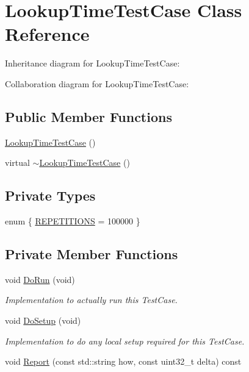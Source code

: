 \hypertarget{classLookupTimeTestCase}{}\section{Lookup\+Time\+Test\+Case Class Reference}
\label{classLookupTimeTestCase}


Inheritance diagram for Lookup\+Time\+Test\+Case\+:


Collaboration diagram for Lookup\+Time\+Test\+Case\+:
\subsection*{Public Member Functions}
\begin{DoxyCompactItemize}
\item 
\hyperlink{classLookupTimeTestCase_a56c831a669769c957ee753342178a473}{Lookup\+Time\+Test\+Case} ()
\item 
virtual \hyperlink{classLookupTimeTestCase_a047431b4e49bffa904794c669b8a710d}{$\sim$\+Lookup\+Time\+Test\+Case} ()
\end{DoxyCompactItemize}
\subsection*{Private Types}
\begin{DoxyCompactItemize}
\item 
enum \{ \hyperlink{classLookupTimeTestCase_a3b615426fb6225fbfe0f6820045c9cc4a907138b831d97cac6261e5dfada683eb}{R\+E\+P\+E\+T\+I\+T\+I\+O\+NS} = 100000
 \}
\end{DoxyCompactItemize}
\subsection*{Private Member Functions}
\begin{DoxyCompactItemize}
\item 
void \hyperlink{classLookupTimeTestCase_a666ef6b8a01c9e1c8c7eddc424f1edc4}{Do\+Run} (void)
\begin{DoxyCompactList}\small\item\em Implementation to actually run this Test\+Case. \end{DoxyCompactList}\item 
void \hyperlink{classLookupTimeTestCase_a37e06aa8bf89b2dad633c668c762d469}{Do\+Setup} (void)
\begin{DoxyCompactList}\small\item\em Implementation to do any local setup required for this Test\+Case. \end{DoxyCompactList}\item 
void \hyperlink{classLookupTimeTestCase_aee4b87d4fdc9cf74b71f7b983db12ffd}{Report} (const std\+::string how, const uint32\+\_\+t delta) const 
\end{DoxyCompactItemize}
